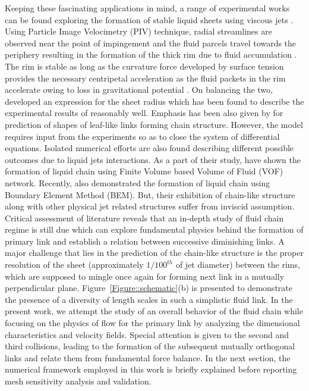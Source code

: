 \documentclass{jfm}
\begin{document}
Keeping these fascinating applications in mind, a range of experimental works can be found exploring the formation of stable liquid sheets using viscous jets \citep{choo2001parametric,choo2002velocity,bush2004collision}. Using Particle Image Velocimetry (PIV) technique, radial streamlines are observed near the point of impingement and the fluid parcels travel towards the periphery resulting in the formation of the thick rim due to fluid accumulation \citep{choo2002velocity,bush2004collision}. The rim is stable as long as the curvature force developed by surface tension provides the necessary centripetal acceleration as the fluid packets in the rim accelerate owing to loss in gravitational potential \citep{bremond2006atomization}. On balancing the two, \cite{taylor1960formation} developed an expression for the sheet radius which has been found to describe the experimental results of \cite{bush2004collision} reasonably well. Emphasis has been also given by \cite{bush2004collision} for prediction of shapes of leaf-like links forming chain structure. However, the model requires input from the experiments so as to close the system of differential equations. Isolated numerical efforts are also found describing different possible outcomes due to liquid jets interactions. As a part of their study, \cite{chen2013high} have shown the formation of liquid chain using Finite Volume based Volume of Fluid (VOF) network. Recently, \cite{da2016surface} also demonstrated the formation of liquid chain using Boundary Element Method (BEM). But, their exhibition of chain-like structure along with other physical jet related structures suffer from inviscid assumption.\\
Critical assessment of literature reveals that an in-depth study of fluid chain regime is still due which can explore fundamental physics behind the formation of primary link and establish a relation between successive diminishing links. A major challenge that lies in the prediction of the chain-like structure is the proper resolution of the sheet (approximately $1/100^{th}$ of jet diameter) between the rims, which are supposed to mingle once again for forming next link in a mutually perpendicular plane. Figure~\ref{Figure::schematic}(b) is presented to demonstrate the presence of a diversity of length scales in such a simplistic fluid link. In the present work, we attempt the study of an overall behavior of the fluid chain while focusing on the physics of flow for the primary link by analyzing the dimensional characteristics and velocity fields. Special attention is given to the second and third collisions, leading to the formation of the subsequent mutually orthogonal links and relate them from fundamental force balance. In the next section, the numerical framework employed in this work is briefly explained before reporting mesh sensitivity analysis and validation.
\end{document}
